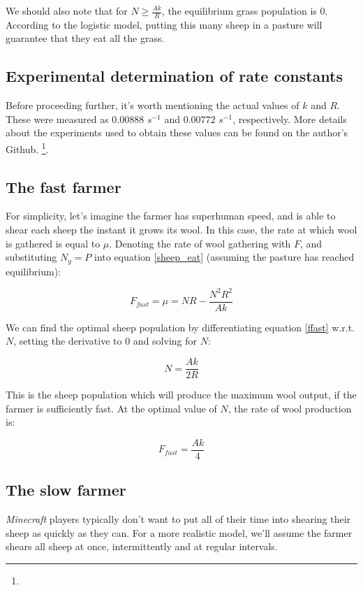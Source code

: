 \documentclass{article}
\theoremstyle{theorem}
\theoremstyle{definition}
\begin{document}
We should also note that for $N\geq \frac{Ak}{R}$, the equilibrium grass population is 0. According to the logistic model, putting this many sheep in a pasture will guarantee that they eat all the grass.

\subsection{Experimental determination of rate constants}

Before proceeding further, it's worth mentioning the actual values of $k$ and $R$. These were measured as $0.00888$ $s^{-1}$ and $0.00772$ $s^{-1}$, respectively. More details about the experiments used to obtain these values can be found on the author's Github. \footnote{}.

\subsection{The fast farmer}

For simplicity, let's imagine the farmer has superhuman speed, and is able to shear each sheep the instant it grows its wool. In this case, the rate at which wool is gathered is equal to $\mu$. Denoting the rate of wool gathering with $F$, and substituting $N_g=P$ into equation \ref{sheep_eat} (assuming the pasture has reached equilibrium):

\begin{equation}
    \label{ffast}
    F_{fast}=\mu=NR-\frac{N^2R^2}{Ak}
\end{equation}

We can find the optimal sheep population by differentiating equation \ref{ffast} w.r.t. $N$, setting the derivative to 0 and solving for $N$:

\begin{equation}
    \label{optimal_n_ffast}
    N=\frac{Ak}{2R}
\end{equation}

This is the sheep population which will produce the maximum wool output, if the farmer is sufficiently fast. At the optimal value of $N$, the rate of wool production is:

$${F_{fast}=\frac{Ak}{4}}$$

\subsection{The slow farmer}

\textit{Minecraft} players typically don't want to put all of their time into shearing their sheep as quickly as they can. For a more realistic model, we'll assume the farmer shears all sheep at once, intermittently and at regular intervals.
\end{document}
